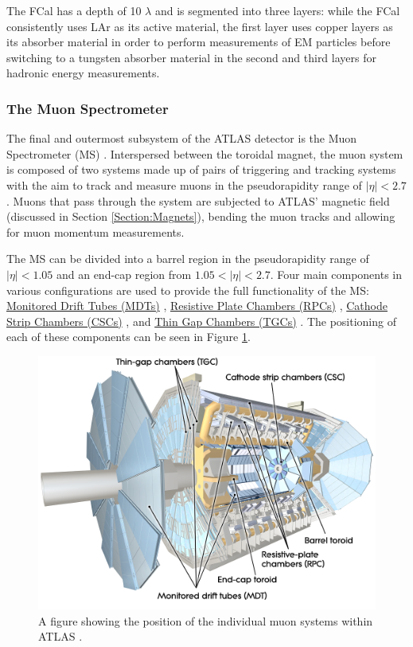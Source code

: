 \documentclass[12pt,a4paper,epsf,portrait,times,epsfig]{article}
\begin{document}
		The FCal has a depth of 10 $\lambda$ and is segmented into three layers: while the FCal consistently uses LAr as its active material, the first layer uses copper layers as its absorber material in order to perform measurements of EM particles before switching to a tungsten absorber material in the second and third layers for hadronic energy measurements.  

		\subsubsection{The Muon Spectrometer}\label{Section:MuonSystem}

		The final and outermost subsystem of the ATLAS detector is the Muon Spectrometer (MS) \cite{ATLASMuonTDR}. Interspersed between the toroidal magnet, the muon system is composed of two systems made up of pairs of triggering and tracking systems with the aim to track and measure muons in the pseudorapidity range of $|\eta| < 2.7$. Muons that pass through the system are subjected to ATLAS' magnetic field (discussed in Section \ref{Section:Magnets}), bending the muon tracks and allowing for muon momentum measurements. \par

		The MS can be divided into a barrel region in the pseudorapidity range of $|\eta| < 1.05$ and an end-cap region from $1.05 < |\eta| < 2.7$. Four main components in various configurations are used to provide the full functionality of the MS: \hyperref[Section:MDTs]{Monitored Drift Tubes (MDTs)} \cite{ATLASMDT}, \hyperref[Section:RPCs]{Resistive Plate Chambers (RPCs)} \cite{ATLASRPC}, \hyperref[Section:CSCs]{Cathode Strip Chambers (CSCs)} \cite{ATLASCSC}, and \hyperref[Section:TGCs]{Thin Gap Chambers (TGCs)} \cite{ATLASTGC}. The positioning of each of these components can be seen in Figure \ref{Fig:MuonSystem}. 

		\begin{figure}
			\centering
			\includegraphics[scale=0.3]{Muon_System}
			\caption{A figure showing the position of the individual muon systems within ATLAS \cite{Article:ATLASDesignPaper}.}
			\label{Fig:MuonSystem}
		\end{figure}
\end{document}
